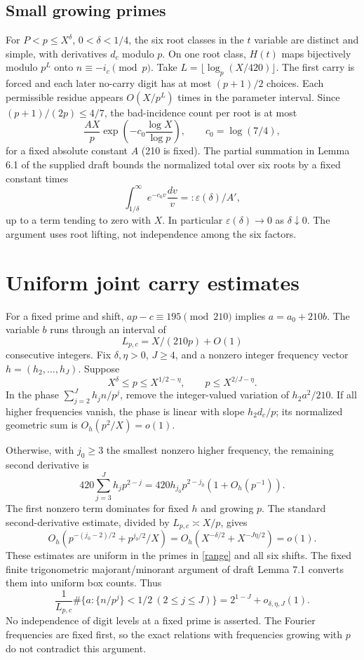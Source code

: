 \documentclass[11pt]{article}
\begin{document}
\subsection{Small growing primes}
For $P<p\le X^\delta$, $0<\delta<1/4$, the six root classes in the $t$ variable
are distinct and simple, with derivatives $d_c$ modulo $p$. On one root class,
$H(t)$ maps bijectively modulo $p^L$ onto $n\equiv-i_c\pmod p$. Take
$L=\lfloor\log_p(X/420)\rfloor$. The first carry is forced and each later
no-carry digit has at most $(p+1)/2$ choices. Each permissible residue appears
$O(X/p^L)$ times in the parameter interval. Since $(p+1)/(2p)\le4/7$, the
bad-incidence count per root is at most
\[
 \frac{A X}p\exp\left(-c_0\frac{\log X}{\log p}\right),\qquad c_0=\log(7/4),
\]
for a fixed absolute constant $A$ (210 is fixed). The partial summation in
Lemma 6.1 of the supplied draft\cite{draft} bounds the normalized total over
six roots by a fixed constant times
\[
 \int_{1/\delta}^{\infty}e^{-c_0v}\frac{dv}{v}=: \varepsilon(\delta)/A',
\]
up to a term tending to zero with $X$. In particular
$\varepsilon(\delta)\to0$ as $\delta\downarrow0$. The argument uses root
lifting, not independence among the six factors.

\section{Uniform joint carry estimates}
For a fixed prime and shift, $ap-c\equiv195\pmod{210}$ implies
$a=a_0+210b$. The variable $b$ runs through an interval of
\begin{equation}\label{length}
 L_{p,c}=X/(210p)+O(1)
\end{equation}
consecutive integers. Fix $\delta,\eta>0$, $J\ge4$, and a nonzero integer
frequency vector $h=(h_2,\ldots,h_J)$. Suppose
\begin{equation}\label{range}
 X^\delta\le p\le X^{1/2-\eta},\qquad p\le X^{2/J-\eta}.
\end{equation}
In the phase $\sum_{j=2}^J h_j n/p^j$, remove the integer-valued variation of
$h_2a^2/210$. If all higher frequencies vanish, the phase is linear with slope
$h_2d_c/p$; its normalized geometric sum is $O_h(p^2/X)=o(1)$.

Otherwise, with $j_0\ge3$ the smallest nonzero higher frequency, the remaining
second derivative is
\[
 420\sum_{j=3}^J h_jp^{2-j}
 =420h_{j_0}p^{2-j_0}(1+O_h(p^{-1})).
\]
The first nonzero term dominates for fixed $h$ and growing $p$. The standard
second-derivative estimate\cite{robert}, divided by $L_{p,c}\asymp X/p$, gives
\[
 O_h\left(p^{-(j_0-2)/2}+p^{j_0/2}/X\right)
 =O_h\left(X^{-\delta/2}+X^{-J\eta/2}\right)=o(1).
\]
These estimates are uniform in the primes in \eqref{range} and all six shifts.
The fixed finite trigonometric majorant/minorant argument of draft Lemma
7.1 converts them into uniform box counts. Thus
\begin{equation}\label{box}
 \frac1{L_{p,c}}\#\{a:\{n/p^j\}<1/2\ (2\le j\le J)\}
 =2^{1-J}+o_{\delta,\eta,J}(1).
\end{equation}
No independence of digit levels at a fixed prime is asserted. The Fourier
frequencies are fixed first, so the exact relations with frequencies growing
with $p$ do not contradict this argument.
\end{document}
